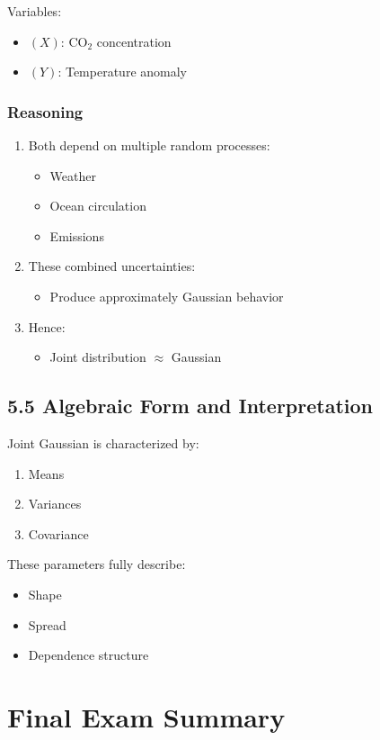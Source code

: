 \documentclass[12pt]{article}
\begin{document}
Variables:
\begin{itemize}
\item $(X)$: CO$_2$ concentration
\item $(Y)$: Temperature anomaly
\end{itemize}

\subsubsection*{Reasoning}

\begin{enumerate}
\item Both depend on multiple random processes:
\begin{itemize}
\item Weather
\item Ocean circulation
\item Emissions
\end{itemize}
\item These combined uncertainties:
\begin{itemize}
\item Produce approximately Gaussian behavior
\end{itemize}
\item Hence:
\begin{itemize}
\item Joint distribution $\approx$ Gaussian
\end{itemize}
\end{enumerate}

\subsection*{5.5 Algebraic Form and Interpretation}

Joint Gaussian is characterized by:
\begin{enumerate}
\item Means
\item Variances
\item Covariance
\end{enumerate}

These parameters fully describe:
\begin{itemize}
\item Shape
\item Spread
\item Dependence structure
\end{itemize}

\section*{Final Exam Summary}
\end{document}
